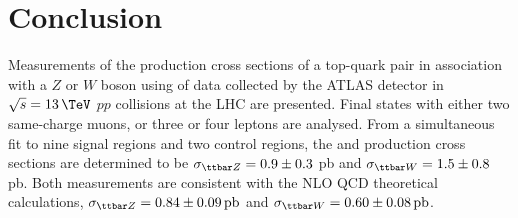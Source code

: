 \section{Conclusion}
\label{s:conclusion}

Measurements of the production cross sections of a top-quark pair in
association with a $Z$ or $W$ boson using \lumi of data collected by the ATLAS
detector in $\sqrt{s} = 13\,\TeV$ $pp$ collisions at the LHC are presented. 
Final states with either two same-charge muons, or three or four leptons
are analysed.  From a simultaneous fit to nine signal regions and two control regions, the
\ttZ and \ttW production cross sections are determined to be $\sttZ = 0.9 \pm
0.3$ pb and $\sttW = 1.5 \pm 0.8$ pb. 
Both measurements are consistent with the NLO
QCD theoretical calculations, $\sttZ = 0.84 \pm 0.09\,\text{pb}$ and $\sttW =
0.60 \pm 0.08\,\text{pb}$.
